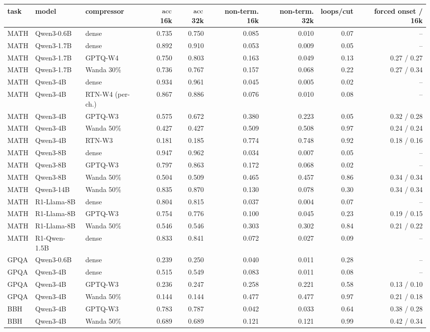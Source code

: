 \begin{tabular}{lllrrrrrr}
\toprule
task & model & compressor & $\mathrm{acc}$ 16k & $\mathrm{acc}$ 32k & non-term. 16k & non-term. 32k & loops/cut & forced onset / 16k \\
\midrule
MATH & Qwen3-0.6B & dense & 0.735 & 0.750 & 0.085 & 0.010 & 0.07 & -- \\
MATH & Qwen3-1.7B & dense & 0.892 & 0.910 & 0.053 & 0.009 & 0.05 & -- \\
MATH & Qwen3-1.7B & GPTQ-W4 & 0.750 & 0.803 & 0.163 & 0.049 & 0.13 & 0.27 / 0.27 \\
MATH & Qwen3-1.7B & Wanda 30\% & 0.736 & 0.767 & 0.157 & 0.068 & 0.22 & 0.27 / 0.34 \\
MATH & Qwen3-4B & dense & 0.934 & 0.961 & 0.045 & 0.005 & 0.02 & -- \\
MATH & Qwen3-4B & RTN-W4 (per-ch.) & 0.867 & 0.886 & 0.076 & 0.010 & 0.08 & -- \\
MATH & Qwen3-4B & GPTQ-W3 & 0.575 & 0.672 & 0.380 & 0.223 & 0.05 & 0.32 / 0.28 \\
MATH & Qwen3-4B & Wanda 50\% & 0.427 & 0.427 & 0.509 & 0.508 & 0.97 & 0.24 / 0.24 \\
MATH & Qwen3-4B & RTN-W3 & 0.181 & 0.185 & 0.774 & 0.748 & 0.92 & 0.18 / 0.16 \\
MATH & Qwen3-8B & dense & 0.947 & 0.962 & 0.034 & 0.007 & 0.05 & -- \\
MATH & Qwen3-8B & GPTQ-W3 & 0.797 & 0.863 & 0.172 & 0.068 & 0.02 & -- \\
MATH & Qwen3-8B & Wanda 50\% & 0.504 & 0.509 & 0.465 & 0.457 & 0.86 & 0.34 / 0.34 \\
MATH & Qwen3-14B & Wanda 50\% & 0.835 & 0.870 & 0.130 & 0.078 & 0.30 & 0.34 / 0.34 \\
MATH & R1-Llama-8B & dense & 0.804 & 0.815 & 0.037 & 0.004 & 0.07 & -- \\
MATH & R1-Llama-8B & GPTQ-W3 & 0.754 & 0.776 & 0.100 & 0.045 & 0.23 & 0.19 / 0.15 \\
MATH & R1-Llama-8B & Wanda 50\% & 0.546 & 0.546 & 0.303 & 0.302 & 0.84 & 0.21 / 0.22 \\
MATH & R1-Qwen-1.5B & dense & 0.833 & 0.841 & 0.072 & 0.027 & 0.09 & -- \\
GPQA & Qwen3-0.6B & dense & 0.239 & 0.250 & 0.040 & 0.011 & 0.28 & -- \\
GPQA & Qwen3-4B & dense & 0.515 & 0.549 & 0.083 & 0.011 & 0.08 & -- \\
GPQA & Qwen3-4B & GPTQ-W3 & 0.236 & 0.247 & 0.258 & 0.221 & 0.58 & 0.13 / 0.10 \\
GPQA & Qwen3-4B & Wanda 50\% & 0.144 & 0.144 & 0.477 & 0.477 & 0.97 & 0.21 / 0.18 \\
BBH & Qwen3-4B & GPTQ-W3 & 0.783 & 0.787 & 0.042 & 0.033 & 0.64 & 0.38 / 0.28 \\
BBH & Qwen3-4B & Wanda 50\% & 0.689 & 0.689 & 0.121 & 0.121 & 0.99 & 0.42 / 0.34 \\
\bottomrule
\end{tabular}
